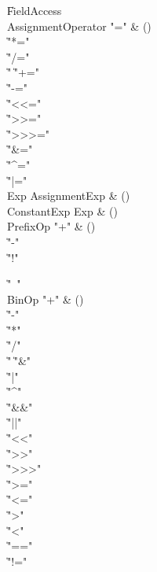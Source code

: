\begin{bbgrammar}
    \| FieldAccess\\
 AssignmentOperator  \label{prod:AssignmentOperator}  \: \xcd"=" & ()\\
    \| \xcd"*="\\
    \| \xcd"/="\\
    \| \xcd"%
    \| \xcd"+="\\
    \| \xcd"-="\\
    \| \xcd"<<="\\
    \| \xcd">>="\\
    \| \xcd">>>="\\
    \| \xcd"&="\\
    \| \xcd"^="\\
    \| \xcd"|="\\
 Exp  \label{prod:Exp}  \: AssignmentExp & ()\\
 ConstantExp  \label{prod:ConstantExp}  \: Exp & ()\\
 PrefixOp  \label{prod:PrefixOp}  \: \xcd"+" & ()\\
    \| \xcd"-"\\
    \| \xcd"!"\\
\end{bbgrammar}

\begin{bbgrammar}

    \| \xcd"~"\\
 BinOp  \label{prod:BinOp}  \: \xcd"+" & ()\\
    \| \xcd"-"\\
    \| \xcd"*"\\
    \| \xcd"/"\\
    \| \xcd"%
    \| \xcd"&"\\
    \| \xcd"|"\\
    \| \xcd"^"\\
    \| \xcd"&&"\\
    \| \xcd"||"\\
    \| \xcd"<<"\\
    \| \xcd">>"\\
    \| \xcd">>>"\\
    \| \xcd">="\\
    \| \xcd"<="\\
    \| \xcd">"\\
    \| \xcd"<"\\
    \| \xcd"=="\\
    \| \xcd"!="\\
\end{bbgrammar}

